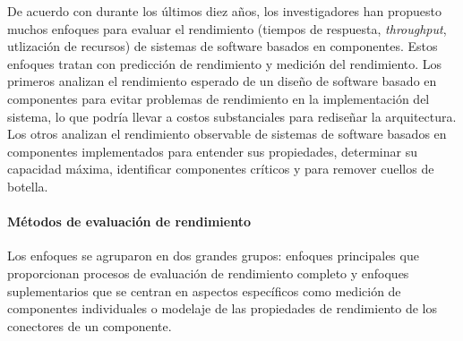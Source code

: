 \documentclass[11pt, twoside]{report}
\begin{document}
De acuerdo con \cite{performance-model-survey} durante los últimos diez años, los investigadores han propuesto muchos enfoques para evaluar el rendimiento (tiempos de respuesta, \emph{throughput}, utlización de recursos) de sistemas de software basados en componentes. Estos enfoques tratan con predicción de rendimiento y medición del rendimiento. Los primeros analizan el rendimiento esperado de un diseño de software basado en componentes para evitar problemas de rendimiento en la implementación del sistema, lo que podría llevar a costos substanciales para rediseñar la arquitectura. Los otros analizan el rendimiento observable de sistemas de software basados en componentes implementados para entender sus propiedades, determinar su capacidad máxima, identificar componentes críticos y para remover cuellos de botella.

\paragraph{Métodos de evaluación de rendimiento}
Los enfoques se agruparon en dos grandes grupos: enfoques principales que proporcionan procesos de evaluación de rendimiento completo y enfoques suplementarios que se centran en aspectos específicos como medición de componentes individuales o modelaje de las propiedades de rendimiento de los conectores de un componente.
\end{document}
